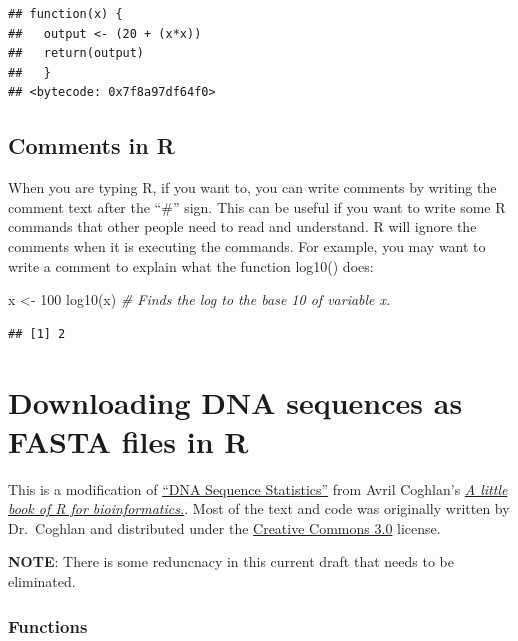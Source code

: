 \documentclass[
]{book}
\newenvironment{Shaded}{\begin{snugshade}}{\end{snugshade}}
\newcommand{\CommentTok}[1]{\textcolor[rgb]{0.56,0.35,0.01}{\textit{#1}}}
\newcommand{\DecValTok}[1]{\textcolor[rgb]{0.00,0.00,0.81}{#1}}
\newcommand{\FunctionTok}[1]{\textcolor[rgb]{0.00,0.00,0.00}{#1}}
\newcommand{\NormalTok}[1]{#1}
\newcommand{\OtherTok}[1]{\textcolor[rgb]{0.56,0.35,0.01}{#1}}
\begin{document}
\begin{verbatim}
## function(x) { 
##   output <- (20 + (x*x)) 
##   return(output)
##   }
## <bytecode: 0x7f8a97df64f0>
\end{verbatim}

\hypertarget{comments-in-r}{%
\section{Comments in R}\label{comments-in-r}}

When you are typing R, if you want to, you can write comments by writing the comment text after the ``\#'' sign. This can be useful if you want to write some R commands that other people need to read and understand. R will ignore the comments when it is executing the commands. For example, you may want to write a comment to explain what the function log10() does:

\begin{Shaded}
\begin{Highlighting}[]
\NormalTok{x }\OtherTok{\textless{}{-}} \DecValTok{100}
\FunctionTok{log10}\NormalTok{(x) }\CommentTok{\# Finds the log to the base 10 of variable x.}
\end{Highlighting}
\end{Shaded}

\begin{verbatim}
## [1] 2
\end{verbatim}

\hypertarget{downloading-dna-sequences-as-fasta-files-in-r}{%
\chapter{Downloading DNA sequences as FASTA files in R}\label{downloading-dna-sequences-as-fasta-files-in-r}}

This is a modification of \href{https://a-little-book-of-r-for-bioinformatics.readthedocs.io/en/latest/src/chapter1.html}{``DNA Sequence Statistics''} from Avril Coghlan's \href{https://a-little-book-of-r-for-bioinformatics.readthedocs.io/en/latest/index.html}{\emph{A little book of R for bioinformatics.}}. Most of the text and code was originally written by Dr.~Coghlan and distributed under the \href{https://creativecommons.org/licenses/by/3.0/us/}{Creative Commons 3.0} license.

\textbf{NOTE}: There is some reduncnacy in this current draft that needs to be eliminated.

\hypertarget{functions-4}{%
\subsection{Functions}\label{functions-4}}
\end{document}
